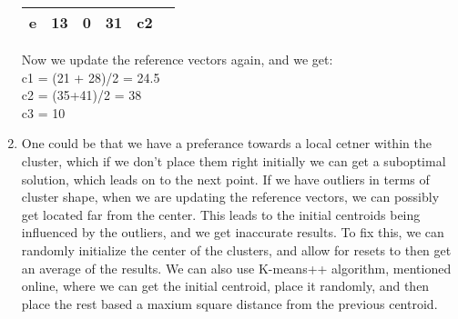 \documentclass{article}
\begin{document}
\begin{enumerate}[label=(\alph*)]
\begin{table}[h]
\begin{tabular}{|c|c|c|c|c|c|}
        e    & 13 & 0  & 31  & c2     \\ \hline
        \end{tabular}
    \end{table}
    Now we update the reference vectors again, and we get:
    \\c1 = (21 + 28)/2 = 24.5
    \\c2 = (35+41)/2 = 38
    \\c3 = 10
    \item One could be that we have a preferance towards a local cetner within 
    the cluster, which if we don't place them right initially we can get a suboptimal solution, which leads on to the next point. If we have outliers in terms of cluster shape, when we are updating the reference vectors, we can possibly get located far 
    from the center. This leads to the initial centroids being influenced by the outliers, and we get inaccurate results. 
    To fix this, we can randomly initialize the center of the clusters, and allow for resets to then get an average of the results. We can also use K-means++ algorithm, mentioned online, where we can get the initial centroid, place it randomly, and then place the rest based a maxium square distance from the previous centroid.
\end{enumerate}
\end{document}
